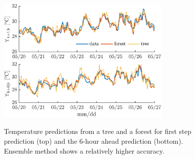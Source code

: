 \begin{figure}[h!]
	\centering
	\includegraphics[width=20pc]{figures/validation-s1.eps}
	\includegraphics[width=20pc]{figures/validation-s6.eps}
	\caption{Temperature predictions from a tree and a forest for first step prediction (top) and the 6-hour ahead prediction (bottom). Ensemble method shows a relatively higher accuracy.}
	\captionsetup{justification=centering}
	\label{F:validation}
\end{figure}

